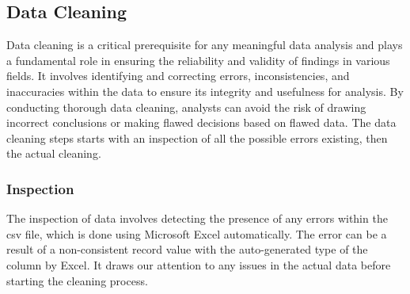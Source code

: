\subsection{Data Cleaning}
Data cleaning is a critical prerequisite for any meaningful data analysis and plays a fundamental role in ensuring the reliability and validity of findings in various fields. It involves identifying and correcting errors, inconsistencies, and inaccuracies within the data to ensure its integrity and usefulness for analysis. By conducting thorough data cleaning, analysts can avoid the risk of drawing incorrect conclusions or making flawed decisions based on flawed data. The data cleaning steps starts with an inspection of all the possible errors existing, then the actual cleaning.
\subsubsection{Inspection}
The inspection of data involves detecting the presence of any errors within the \ac{csv} file, which is done using Microsoft Excel automatically. The error can be a result of a non-consistent record value with the auto-generated type of the column by Excel. It draws our attention to any issues in the actual data before starting the cleaning process.

